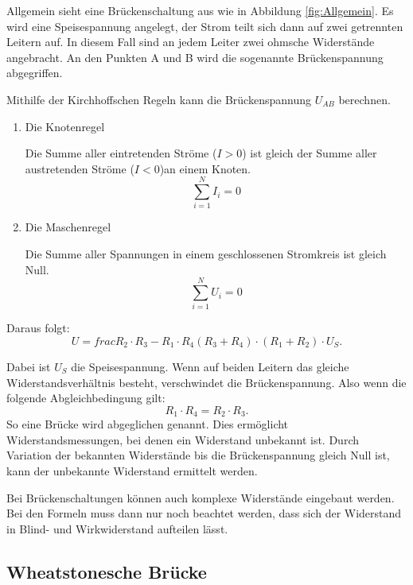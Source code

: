 Allgemein sieht eine Brückenschaltung aus wie in Abbildung \ref{fig:Allgemein}.
Es wird eine Speisespannung angelegt, der Strom teilt sich dann auf zwei getrennten Leitern auf.
In diesem Fall sind an jedem Leiter zwei ohmsche Widerstände angebracht.
An den Punkten A und B wird die sogenannte Brückenspannung abgegriffen.

Mithilfe der Kirchhoffschen Regeln kann die Brückenspannung $U_{AB}$ berechnen.
\begin{enumerate}
    \item {Die Knotenregel
    
    Die Summe aller eintretenden Ströme ($I>0$) ist gleich der Summe aller austretenden Ströme ($I<0$)an einem Knoten.
    \begin{equation}
        {\sum_{i=1}^N I_i} = 0
    \end{equation}
    }

    \item{Die Maschenregel
    
    Die Summe aller Spannungen in einem geschlossenen Stromkreis ist gleich Null.
    \begin{equation}
        {\sum_{i=1}^N U_i} = 0
    \end{equation}}
\end{enumerate}

Daraus folgt:
\begin{equation}
    U = frac{R_2 \cdot R_3 - R_1 \cdot R_4}{(R_3 + R_4) \cdot (R_1 + R_2)} \cdot U_S .
\end{equation}

Dabei ist $U_S$ die Speisespannung.
Wenn auf beiden Leitern das gleiche Widerstandsverhältnis besteht, verschwindet die Brückenspannung.
Also wenn die folgende Abgleichbedingung gilt:
\begin{equation}
\label{eq:Abgleichbedingung}
    R_1 \cdot R_4 = R_2 \cdot R_3 .
\end{equation}
So eine Brücke wird abgeglichen genannt.
Dies ermöglicht Widerstandsmessungen, bei denen ein Widerstand unbekannt ist.
Durch Variation der bekannten Widerstände bis die Brückenspannung gleich Null ist, kann der unbekannte Widerstand ermittelt werden.

Bei Brückenschaltungen können auch komplexe Widerstände eingebaut werden.
Bei den Formeln muss dann nur noch beachtet werden, dass sich der Widerstand in Blind- und Wirkwiderstand aufteilen lässt.

\subsection{Wheatstonesche Brücke}

